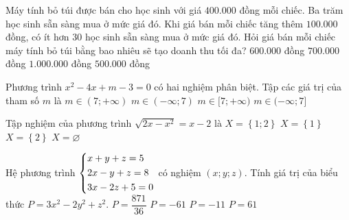 \begin{ex}%
Máy tính bỏ túi được bán cho học sinh với giá $400.000$ đồng mỗi chiếc. Ba trăm học sinh sẵn sàng mua ở mức giá đó. Khi giá bán mỗi chiếc tăng thêm $100.000$ đồng, có ít hơn $30$ học sinh sẵn sàng mua ở mức giá đó. Hỏi giá bán mỗi chiếc máy tính bỏ túi bằng bao nhiêu sẽ tạo doanh thu tối đa?
\choice
{$600.000$ đồng}
{\True $700.000$ đồng}
{$1.000.000$ đồng}
{$500.000$ đồng}
\end{ex}
\begin{ex}%
Phương trình $x^2-4x+m-3=0$ có hai nghiệm phân biệt. Tập các giá trị của tham số $m$ là
\choice
{$m\in (7;+\infty )$}
{\True $m \in \left( - \infty; 7 \right) $}
{$m \in [7;+\infty )$}
{$m \in (-\infty; 7]$}
\end{ex}
\begin{ex}%
Tập nghiệm của phương trình $\sqrt{2x-x^2}=x-2$ là
\choice
{$X=\left\lbrace 1;2 \right\rbrace$}
{$X=\left\lbrace 1 \right\rbrace $}
{\True $ X=\left\lbrace 2 \right\rbrace$}
{$X=\varnothing $}
\end{ex}
\begin{ex}%
Hệ phương trình $\left\{\begin{aligned}&x+y+z=5\\ & 2x-y+z=8\\&3x-2z+5=0\end{aligned}\right.$ có nghiệm $(x;y;z)$. Tính giá trị của biểu thức $P=3x^2-2y^2+z^2$.
\choice
{\True $P=\dfrac{871}{36} $}
{$P=-61$}
{$P=-11$}
{$P=61$}
\end{ex}

